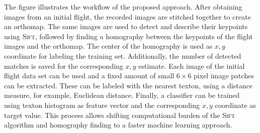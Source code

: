 The figure illustrates
    the workflow of the proposed approach. After obtaining images from an initial flight,
    the recorded images are stitched together to create an orthomap. The same
    images are used to detect and describe their keypoints using
    \textsc{Sift}, followed by finding a homography between the keypoints of the flight
    images and the orthomap. The center of the homography is used as
    $x, y$ coordinate for labeling the training set. Additionally, the
    number of detected matches is saved for the corresponding $x, y$
    estimate. Each image of the initial flight data set can be used
    and a fixed amount of small $6\times6$ pixel image patches can be
    extracted. These can be labeled with the nearest texton, using a
    distance measure, for example, Euclidean distance. Finally, a
    classifier can be trained using texton histogram as feature vector
    and the corresponding $x, y$ coordinate as target value. This
    process allows shifting computational burden of the \textsc{Sift}
    algorithm and homography finding to a faster machine learning
    approach.